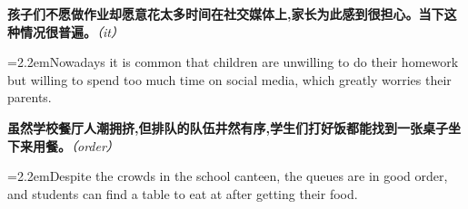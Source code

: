 \documentclass[11pt,a4paper]{article}
\newcommand{\num}[1]{\makebox[1.9em][r]{#1.}\hspace{0.3em}}
\newcommand{\prompt}[1]{\emph{\textcolor{tipblue}{\small（#1）}}}
\begin{document}
\begin{minipage}{\linewidth}

\num{3}\textbf{孩子们不愿做作业却愿意花太多时间在社交媒体上,家长为此感到很担心。当下这种情况很普遍。}\prompt{it}

\vspace{0.15em}

\noindent\hangindent=2.2em\hspace{2.2em}Nowadays it is common that children are unwilling to do their homework but willing to spend too much time on social media, which greatly worries their parents.

\end{minipage}

\begin{minipage}{\linewidth}

\num{4}\textbf{虽然学校餐厅人潮拥挤,但排队的队伍井然有序,学生们打好饭都能找到一张桌子坐下来用餐。}\prompt{order}

\vspace{0.15em}

\noindent\hangindent=2.2em\hspace{2.2em}Despite the crowds in the school canteen, the queues are in good order, and students can find a table to eat at after getting their food.

\end{minipage}
\end{document}
